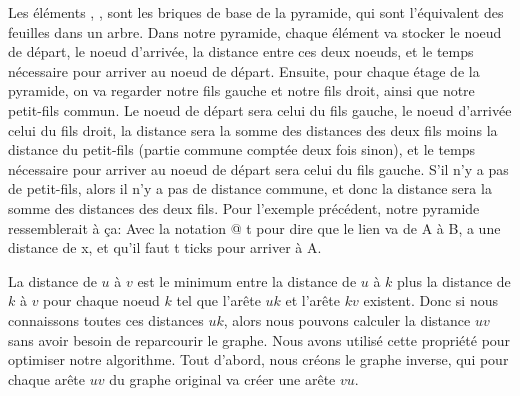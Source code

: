 Les éléments , ,  
sont les briques de base de la pyramide, qui sont l'équivalent des feuilles dans un arbre.
Dans notre pyramide, chaque élément va stocker le noeud de départ, le noeud d'arrivée, la distance entre ces deux noeuds, et le temps nécessaire pour arriver au noeud de départ.
Ensuite, pour chaque étage de la pyramide, on va regarder notre fils gauche et notre fils droit, ainsi que notre petit-fils commun.
Le noeud de départ sera celui du fils gauche, le noeud d'arrivée celui du fils droit, la distance sera la somme des distances des deux fils moins la distance du petit-fils (partie commune comptée deux fois sinon), et le temps nécessaire pour arriver au noeud de départ sera celui du fils gauche.
S'il n'y a pas de petit-fils, alors il n'y a pas de distance commune, et donc la distance sera la somme des distances des deux fils.
Pour l'exemple précédent, notre pyramide ressemblerait à ça:
Avec la notation  @ t pour dire que le lien va de A à B, a une distance de x, et qu'il faut t ticks pour arriver à A.
\usetikzlibrary{calc, positioning}
\begin{center}
\end{center}


La distance de $u$ à $v$ est le minimum entre la distance de $u$ à $k$ plus la distance de $k$ à $v$ pour chaque noeud $k$ tel que l'arête $u$\linkright$k$ et l'arête $k$\linkright$v$ existent.
Donc si nous connaissons toutes ces distances $u$\linkright$k$, alors nous pouvons calculer la distance $u$\linkright$v$ sans avoir besoin de reparcourir le graphe.
Nous avons utilisé cette propriété pour optimiser notre algorithme.
Tout d'abord, nous créons le graphe inverse, qui pour chaque arête $u$\linkright$v$ du graphe original va créer une arête $v$\linkright$u$.

